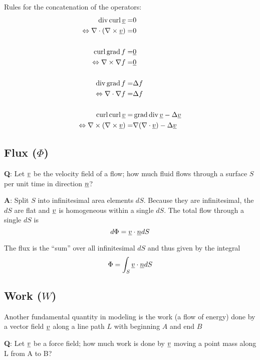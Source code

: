 Rules for the concatenation of the operators:
\[
\begin{aligned}
	\operatorname*{div} \operatorname*{curl} \underline{v} = &  0 \\
	\Leftrightarrow \nabla \cdot ( \nabla \times\underline{v} ) = &  0 \\
	\\
	\operatorname*{curl} \operatorname*{grad} f = &  \underline{0} \\
	\Leftrightarrow \nabla \times \nabla f = & \underline{0}\\
	\\
	\operatorname*{div} \operatorname*{grad} f = & \Delta f \\
	\Leftrightarrow \nabla \cdot \nabla f = &  \Delta f\\
	\\
	\operatorname*{curl} \operatorname*{curl} \underline{v} = & \operatorname*{grad}  \operatorname*{div} \underline{v} - \Delta \underline{v} \\
	\Leftrightarrow \nabla \times (\nabla \times \underline{v}) =  & \nabla  (\nabla \cdot \underline{v}) - \Delta \underline{v}\\
\end{aligned}
\]



\subsection*{Flux ($\Phi$)}

\textbf{Q}: Let $\underline{v}$ be the velocity field of a flow;
how much fluid flows through a surface $S$ per unit time in direction $\underline{n}$?

\textbf{A}: Split $S$ into infinitesimal area elements $dS$. 
Because they are infinitesimal, the $dS$ are flat and $\underline{v}$ is homogeneous within a single $dS$.
The total flow through a single $dS$ is
\[
	d\Phi = \underline{v} \cdot \underline{n} dS
\]

The flux is the “sum” over all infinitesimal $dS$ and thus given by the integral
\[
	\Phi = \int_S \underline{v} \cdot \underline{n} dS
\]





\subsection*{Work ($W$)}

Another fundamental quantity in modeling is the work (a flow of energy) done by
a vector field $\underline{v}$ along a line path $L$ with beginning $A$ and end $B$

\textbf{Q}: Let $\underline{v}$ be a force field; how much work is done by $\underline{v}$ moving a point mass
along L from A to B?

